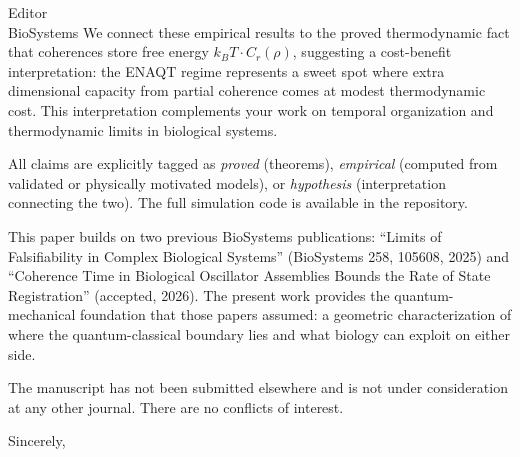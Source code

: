 \documentclass[12pt,a4paper]{letter}
\begin{document}
\begin{letter}{Editor\\BioSystems}
We connect these empirical results to the proved thermodynamic fact that coherences store free energy $k_BT \cdot C_r(\rho)$, suggesting a cost-benefit interpretation: the ENAQT regime represents a sweet spot where extra dimensional capacity from partial coherence comes at modest thermodynamic cost. This interpretation complements your work on temporal organization and thermodynamic limits in biological systems.

All claims are explicitly tagged as \emph{proved} (theorems), \emph{empirical} (computed from validated or physically motivated models), or \emph{hypothesis} (interpretation connecting the two). The full simulation code is available in the repository.

This paper builds on two previous BioSystems publications: ``Limits of Falsifiability in Complex Biological Systems'' (BioSystems 258, 105608, 2025) and ``Coherence Time in Biological Oscillator Assemblies Bounds the Rate of State Registration'' (accepted, 2026). The present work provides the quantum-mechanical foundation that those papers assumed: a geometric characterization of where the quantum-classical boundary lies and what biology can exploit on either side.

The manuscript has not been submitted elsewhere and is not under consideration at any other journal. There are no conflicts of interest.

\closing{Sincerely,}

\end{letter}
\end{document}
